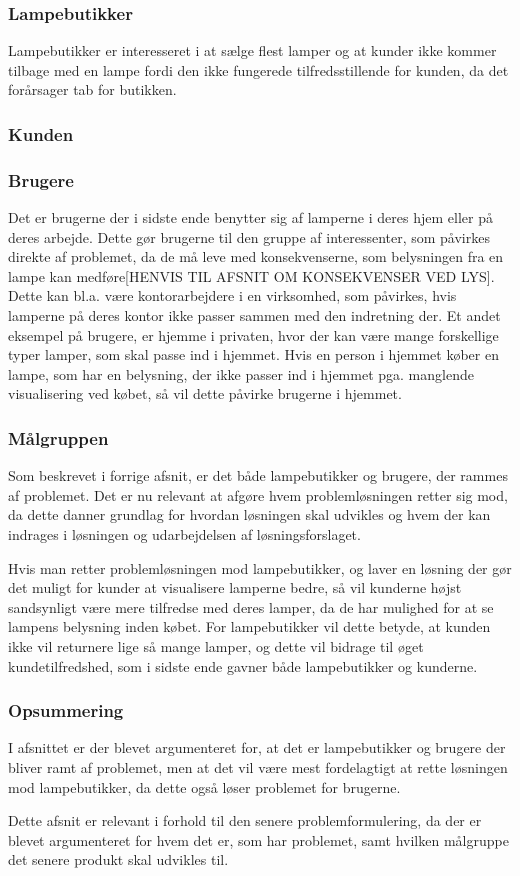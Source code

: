 \subsubsection{Lampebutikker}
Lampebutikker er interesseret i at sælge flest lamper og at kunder ikke kommer tilbage med en lampe fordi den ikke fungerede tilfredsstillende for kunden, da det forårsager tab for butikken.

\subsubsection{Kunden}

\subsubsection{Brugere}
Det er brugerne der i sidste ende benytter sig af lamperne i deres hjem eller på deres arbejde. Dette gør brugerne til den gruppe af interessenter, som påvirkes direkte af problemet, da de må leve med konsekvenserne, som belysningen fra en lampe kan medføre[HENVIS TIL AFSNIT OM KONSEKVENSER VED LYS]. Dette kan bl.a. være kontorarbejdere i en virksomhed, som påvirkes, hvis lamperne på deres kontor ikke passer sammen med den indretning der. Et andet eksempel på brugere, er hjemme i privaten, hvor der kan være mange forskellige typer lamper, som skal passe ind i hjemmet. Hvis en person i hjemmet køber en lampe, som har en belysning, der ikke passer ind i hjemmet pga. manglende visualisering ved købet, så vil dette påvirke brugerne i hjemmet. 

\subsubsection{Målgruppen}
Som beskrevet i forrige afsnit, er det både lampebutikker og brugere, der rammes af problemet. Det er nu relevant at afgøre hvem problemløsningen retter sig mod, da dette danner grundlag for hvordan løsningen skal udvikles og hvem der kan indrages i løsningen og udarbejdelsen af løsningsforslaget. 


Hvis man retter problemløsningen mod lampebutikker, og laver en løsning der gør det muligt for kunder at visualisere lamperne bedre, så vil kunderne højst sandsynligt være mere tilfredse med deres lamper, da de har mulighed for at se lampens belysning inden købet. For lampebutikker vil dette betyde, at kunden ikke vil returnere lige så mange lamper, og dette vil bidrage til øget kundetilfredshed, som i sidste ende gavner både lampebutikker og kunderne.

\subsubsection*{Opsummering}
I afsnittet er der blevet argumenteret for, at det er lampebutikker og brugere der bliver ramt af problemet, men at det vil være mest fordelagtigt at rette løsningen mod lampebutikker, da dette også løser problemet for brugerne.

Dette afsnit er relevant i forhold til den senere problemformulering, da der er blevet argumenteret for hvem det er, som har problemet, samt hvilken målgruppe det senere produkt skal udvikles til.
